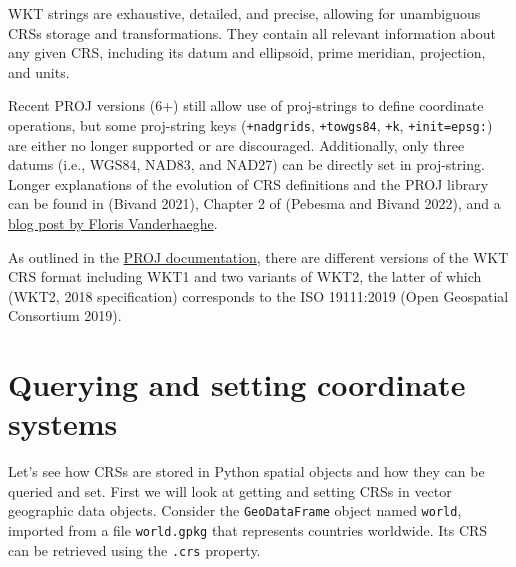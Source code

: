 \documentclass[
  letterpaper,
]{krantz}
\begin{document}
WKT strings are exhaustive, detailed, and precise, allowing for
unambiguous CRSs storage and transformations. They contain all relevant
information about any given CRS, including its datum and ellipsoid,
prime meridian, projection, and units.

Recent PROJ versions (6+) still allow use of proj-strings to define
coordinate operations, but some proj-string keys (\texttt{+nadgrids},
\texttt{+towgs84}, \texttt{+k}, \texttt{+init=epsg:}) are either no
longer supported or are discouraged. Additionally, only three datums
(i.e., WGS84, NAD83, and NAD27) can be directly set in proj-string.
Longer explanations of the evolution of CRS definitions and the PROJ
library can be found in (Bivand 2021), Chapter 2 of (Pebesma and Bivand
2022), and a
\href{https://inbo.github.io/tutorials/tutorials/spatial_crs_coding/}{blog
post by Floris Vanderhaeghe}.

\begin{tcolorbox}[enhanced jigsaw, title=\textcolor{quarto-callout-note-color}{\faInfo}\hspace{0.5em}{Note}, coltitle=black, colbacktitle=quarto-callout-note-color!10!white, breakable, titlerule=0mm, colframe=quarto-callout-note-color-frame, opacitybacktitle=0.6, colback=white, bottomrule=.15mm, left=2mm, leftrule=.75mm, toprule=.15mm, toptitle=1mm, bottomtitle=1mm, arc=.35mm, opacityback=0, rightrule=.15mm]

As outlined in the
\href{https://proj.org/development/reference/cpp/cpp_general.html}{PROJ
documentation}, there are different versions of the WKT CRS format
including WKT1 and two variants of WKT2, the latter of which (WKT2, 2018
specification) corresponds to the ISO 19111:2019 (Open Geospatial
Consortium 2019).

\end{tcolorbox}

\section{Querying and setting coordinate
systems}\label{sec-querying-and-setting-coordinate-systems}

Let's see how CRSs are stored in Python spatial objects and how they can
be queried and set. First we will look at getting and setting CRSs in
vector geographic data objects. Consider the \texttt{GeoDataFrame}
object named \texttt{world}, imported from a file \texttt{world.gpkg}
that represents countries worldwide. Its CRS can be retrieved using the
\texttt{.crs} property.
\end{document}
